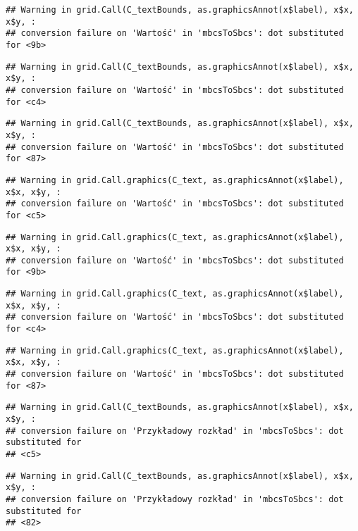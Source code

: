 \documentclass[
]{book}
\begin{document}
\begin{verbatim}
## Warning in grid.Call(C_textBounds, as.graphicsAnnot(x$label), x$x, x$y, :
## conversion failure on 'Wartość' in 'mbcsToSbcs': dot substituted for <9b>
\end{verbatim}

\begin{verbatim}
## Warning in grid.Call(C_textBounds, as.graphicsAnnot(x$label), x$x, x$y, :
## conversion failure on 'Wartość' in 'mbcsToSbcs': dot substituted for <c4>
\end{verbatim}

\begin{verbatim}
## Warning in grid.Call(C_textBounds, as.graphicsAnnot(x$label), x$x, x$y, :
## conversion failure on 'Wartość' in 'mbcsToSbcs': dot substituted for <87>
\end{verbatim}

\begin{verbatim}
## Warning in grid.Call.graphics(C_text, as.graphicsAnnot(x$label), x$x, x$y, :
## conversion failure on 'Wartość' in 'mbcsToSbcs': dot substituted for <c5>
\end{verbatim}

\begin{verbatim}
## Warning in grid.Call.graphics(C_text, as.graphicsAnnot(x$label), x$x, x$y, :
## conversion failure on 'Wartość' in 'mbcsToSbcs': dot substituted for <9b>
\end{verbatim}

\begin{verbatim}
## Warning in grid.Call.graphics(C_text, as.graphicsAnnot(x$label), x$x, x$y, :
## conversion failure on 'Wartość' in 'mbcsToSbcs': dot substituted for <c4>
\end{verbatim}

\begin{verbatim}
## Warning in grid.Call.graphics(C_text, as.graphicsAnnot(x$label), x$x, x$y, :
## conversion failure on 'Wartość' in 'mbcsToSbcs': dot substituted for <87>
\end{verbatim}

\begin{verbatim}
## Warning in grid.Call(C_textBounds, as.graphicsAnnot(x$label), x$x, x$y, :
## conversion failure on 'Przykładowy rozkład' in 'mbcsToSbcs': dot substituted for
## <c5>
\end{verbatim}

\begin{verbatim}
## Warning in grid.Call(C_textBounds, as.graphicsAnnot(x$label), x$x, x$y, :
## conversion failure on 'Przykładowy rozkład' in 'mbcsToSbcs': dot substituted for
## <82>
\end{verbatim}
\end{document}
